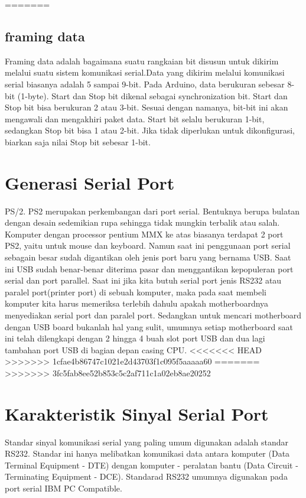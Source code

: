 {{=======
\subsection {framing data}
Framing data adalah bagaimana suatu rangkaian bit disusun untuk dikirim melalui suatu sistem komunikasi serial.Data yang dikirim melalui komunikasi serial biasanya adalah 5 sampai 9-bit. Pada Arduino, data berukuran sebesar 8-bit (1-byte).
Start dan Stop bit dikenal sebagai synchronization bit. Start dan Stop bit bisa berukuran 2 atau 3-bit. Sesuai dengan namanya, bit-bit ini akan mengawali dan mengakhiri paket data. Start bit selalu berukuran 1-bit, sedangkan Stop bit bisa 1 atau 2-bit. Jika tidak diperlukan untuk dikonfigurasi, biarkan saja nilai Stop bit sebesar 1-bit.

\section {Generasi Serial Port}
PS/2. PS2 merupakan perkembangan dari port serial. Bentuknya berupa bulatan dengan desain sedemikian rupa sehingga tidak mungkin terbalik atau salah. Komputer dengan processor pentium MMX ke atas biasanya terdapat 2 port PS2, yaitu untuk mouse dan keyboard.
Namun saat ini penggunaan port serial sebagain besar sudah digantikan oleh jenis port baru yang bernama USB. Saat ini USB sudah benar-benar diterima pasar dan menggantikan kepopuleran port serial dan port parallel. Saat ini jika kita butuh serial port jenis RS232 atau paralel port(printer port) di sebuah komputer, maka pada saat membeli komputer kita harus memeriksa terlebih dahulu apakah motherboardnya menyediakan serial port dan paralel port. Sedangkan untuk mencari motherboard dengan USB board bukanlah hal yang sulit, umumnya setiap motherboard saat ini telah dilengkapi dengan 2 hingga 4 buah slot port USB dan dua lagi tambahan port USB di bagian depan casing CPU.
<<<<<<< HEAD
>>>>>>> 1cfae4b86747c1021e2d43703f1c095f5aaaaa60
=======
>>>>>>> 3fc5fab8ee52b853c5c2af711c1a02eb8ae20252

\section{Karakteristik Sinyal Serial Port}
Standar sinyal komunikasi serial yang paling umum digunakan adalah standar RS232. Standar ini hanya melibatkan komunikasi data antara komputer (Data Terminal Equipment - DTE) dengan komputer - peralatan bantu (Data Circuit - Terminating Equipment - DCE). Standarad RS232 umumnya digunakan pada port serial IBM PC Compatible.
}}

